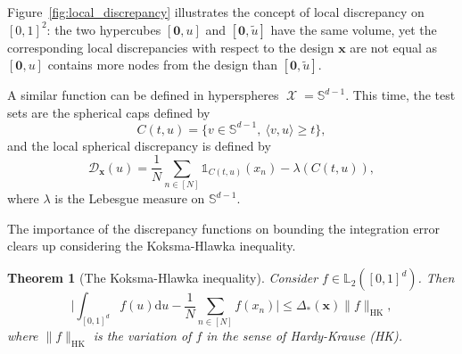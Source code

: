 \documentclass[twoside,11pt]{book}
\newtheorem{theorem}{Theorem}
\numberwithin{theorem}{chapter}
\numberwithin{definition}{chapter}
\numberwithin{proposition}{chapter}
\numberwithin{corollary}{chapter}
\numberwithin{example}{chapter}
\numberwithin{lemma}{chapter}
\DeclareMathOperator{\X}{\mathcal{X}}
\begin{document}
Figure~\ref{fig:local_discrepancy} illustrates the concept of local discrepancy on $[0,1]^{2}$: the two hypercubes $[\bm{0},u]$ and $[\bm{0},\tilde{u}]$ have the same volume, yet the corresponding local discrepancies with respect to the design $\bm{x}$ are not equal as $[\bm{0},u]$ contains more nodes from the design than $[\bm{0},\tilde{u}]$.

A similar function can be defined in hyperspheres $\X = \mathbb{S}^{d-1}$. This time, the test sets are the spherical caps defined by
\begin{equation}
C(t,u) = \{ v \in \mathbb{S}^{d-1}, \: \langle v, u \rangle \geq t\},
\end{equation}
and the local spherical discrepancy is defined by
\begin{equation}
\mathcal{D}_{\bm{x}}(u) = \frac{1}{N}\sum\limits_{n \in [N]} \mathbb{1}_{C(t,u)}(x_n) - \lambda(C(t,u)),
\end{equation}
where $\lambda$ is the Lebesgue measure on $\mathbb{S}^{d-1}$.


The importance of the discrepancy functions on bounding the integration error clears up considering the Koksma-Hlawka inequality.


\begin{theorem}[The Koksma-Hlawka inequality]\label{thm:KH_ineq}
Consider $f \in \mathbb{L}_{2}([0,1]^{d})$. Then 
\begin{equation}\label{eq:KH_ineq}
\bigg| \int_{[0,1]^{d}} f(u) \mathrm{d}u - \frac{1}{N} \sum\limits_{n \in [N]}  f(x_{n})\bigg| \leq \Delta_{*}(\bm{x}) \|f\|_{\mathrm{HK}},
\end{equation}
where $\|f\|_{\mathrm{HK}}$ is the variation of $f$ in the sense of Hardy-Krause (HK). 


\end{theorem}
\end{document}
